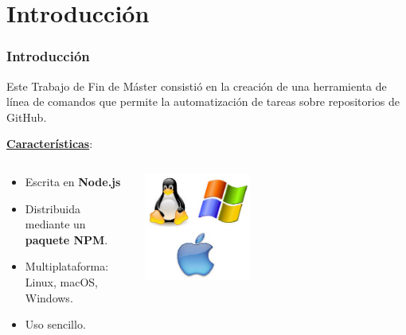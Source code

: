 \documentclass{beamer}
\begin{document}
\section{Introducción}
\begin{frame}[fragile]
  \frametitle{Introducción}
  
  	\begin{center}
    	Este Trabajo de Fin de Máster consistió en la creación de una herramienta de línea de comandos que permite la automatización de tareas sobre repositorios de GitHub.
    \end{center} 
    \bigskip
    
    \underline{{\bfseries Características}}:
    
    \begin{columns}
        \begin{column}{9cm}
        	\begin{itemize}
	        	\item Escrita en {\bfseries Node.js}
    		    \item Distribuida mediante un {\bfseries paquete NPM}.
	    	   	\item Multiplataforma: Linux, macOS, Windows.
	       		\item Uso sencillo.
	       	\end{itemize}
        \end{column}
        \begin{column}{8cm}
          \includegraphics[width=0.4\textwidth]{images/cross_platform.eps}
        \end{column}
      \end{columns}
   
\end{frame}
 
\end{document}
